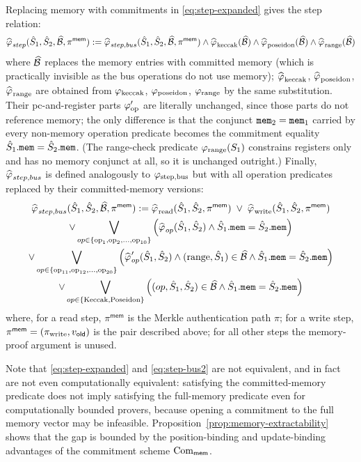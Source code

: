 Replacing memory with commitments in \eqref{eq:step-expanded}
 gives the step relation:
\begin{equation}\label{eq:step-bus2}
  \widehat{\varphi_{\mathrm{}}}_{step}(\hat{S}_1,\hat{S}_2,\widehat{\mathcal{B}},\pi^{\mathsf{mem}})
 :=\widehat{\varphi_{\mathrm{}}}_{step,bus}(\hat{S}_1,\hat{S}_2,\widehat{\mathcal{B}},\pi^{\mathsf{mem}})
\wedge  \widehat{\varphi_{\mathrm{}}}_{\mathrm{keccak}}(\widehat{\mathcal{B}})\wedge \widehat{\varphi_{\mathrm{}}}_{\mathrm{poseidon}}(\widehat{\mathcal{B}}) \wedge \widehat{\varphi_{\mathrm{}}}_{\mathrm{range}}(\widehat{\mathcal{B}})
\end{equation}
where $\widehat{\mathcal{B}}$ replaces the memory entries with
committed memory (which is practically invisible as
the bus operations do not use memory); $\widehat{\varphi_{\mathrm{}}}_{\mathrm{keccak}}$,
$\widehat{\varphi_{\mathrm{}}}_{\mathrm{poseidon}}$, $\widehat{\varphi_{\mathrm{}}}_{\mathrm{range}}$ are obtained from
$\varphi_{\mathrm{\mathrm{keccak}}}$, $\varphi_{\mathrm{\mathrm{poseidon}}}$, $\varphi_{\mathrm{\mathrm{range}}}$ by the same substitution.
Their pc-and-register parts $\varphi_{\mathrm{op}}'$ are literally unchanged, since those
parts do not reference memory; the only difference is that the conjunct
$\mathtt{mem}_2=\mathtt{mem}_1$ carried by every non-memory operation predicate becomes the
commitment equality $\hat{S}_1.\mathtt{mem}=\hat{S}_2.\mathtt{mem}$.  (The range-check predicate
$\varphi_{\mathrm{range}}(S_1)$ constrains registers only and has no memory conjunct at all,
so it is unchanged outright.)  Finally, $\widehat{\varphi_{\mathrm{}}}_{step,bus}$ is
defined analogously to $\varphi_{\mathrm{step,bus}}$
but with all operation predicates replaced
by their committed-memory versions:
\begin{multline}
	\widehat{\varphi_{\mathrm{}}}_{step,bus}(\hat{S}_1,\hat{S}_2,\widehat{\mathcal{B}},\pi^{\mathsf{mem}}):=
\widehat{\varphi_{\mathrm{}}}_{\mathrm{read}}(\hat{S}_1,\hat{S}_2,\pi^{\mathsf{mem}})
\;\vee\; \widehat{\varphi_{\mathrm{}}}_{\mathrm{write}}(\hat{S}_1,\hat{S}_2,\pi^{\mathsf{mem}})\\
\vee\bigvee_{op\in \{\mathrm{op}_1,\mathrm{op}_2,\ldots,\mathrm{op}_{10}\}}
\left(\widehat{\varphi_{\mathrm{}}}_{op}(\hat{S}_1,\hat{S}_2)
\wedge \hat{S}_1.\mathtt{mem}=\hat{S}_2.\mathtt{mem}
\right)\\
\vee\bigvee_{op\in \{\mathrm{op}_{11},\mathrm{op}_{12},\ldots,\mathrm{op}_{20}\}}
 \left(\widehat{\varphi_{\mathrm{}}}_{op}'(\hat{S}_1,\hat{S}_2)
\wedge (\mathrm{range},\hat{S}_1)\in\widehat{\mathcal{B}}
\wedge \hat{S}_1.\mathtt{mem}=\hat{S}_2.\mathtt{mem}\right)\\
\vee\bigvee_{op\in \{\text{Keccak},\text{Poseidon}\}} \left((op,\hat{S}_1,\hat{S}_2)\in\widehat{\mathcal{B}}
\wedge \hat{S}_1.\mathtt{mem}=\hat{S}_2.\mathtt{mem}\right)
\end{multline}
where, for a read step, $\pi^{\mathsf{mem}}$ is the Merkle authentication path $\pi$;
for a write step, $\pi^{\mathsf{mem}} = (\pi_{\mathrm{write}}, v_{\mathsf{old}})$ is the pair
described above; for all other steps the memory-proof argument is unused.


Note that \eqref{eq:step-expanded} and \eqref{eq:step-bus2} are not equivalent, and in fact are
not even computationally equivalent: satisfying the committed-memory predicate does not imply
satisfying the full-memory predicate even for computationally bounded provers, because opening
a commitment to the full memory vector may be infeasible.
Proposition~\ref{prop:memory-extractability} shows that the gap is bounded by the position-binding
and update-binding advantages of the commitment scheme $\mathrm{Com}_{\mathsf{mem}}$.